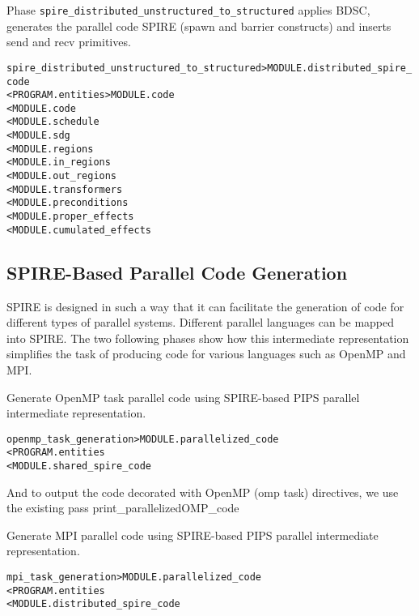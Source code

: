 \documentclass[a4paper]{report}
\newenvironment{PipsMake}{\begin{alltt}}{\end{alltt}}
\newenvironment{PipsPass}[1]{\label{pass:#1}}{}
\begin{document}
\begin{PipsPass}{spire_distributed_unstructured_to_structured}
Phase \texttt{spire\_distributed\_unstructured\_to\_structured}
applies BDSC, generates the parallel code SPIRE (spawn and barrier
constructs) and inserts send and recv primitives.
\end{PipsPass}

\begin{PipsMake}
spire_distributed_unstructured_to_structured                   > MODULE.distributed_spire_code
        < PROGRAM.entities                                     > MODULE.code
        < MODULE.code
        < MODULE.schedule
        < MODULE.sdg
        < MODULE.regions
        < MODULE.in_regions
        < MODULE.out_regions
        < MODULE.transformers
        < MODULE.preconditions
        < MODULE.proper_effects
        < MODULE.cumulated_effects
\end{PipsMake}


\subsection{SPIRE-Based Parallel Code Generation}
SPIRE is designed in such a way that it can facilitate the generation
of code for different types of parallel systems. Different parallel
languages can be mapped into SPIRE. The two following phases show how this intermediate representation simplifies the task of producing code for various languages such as OpenMP and MPI.

\begin{PipsPass}{openmp_task_generation}
Generate OpenMP task parallel code using SPIRE-based PIPS parallel
intermediate representation.
\end{PipsPass}

\begin{PipsMake}
openmp_task_generation                  > MODULE.parallelized_code
        < PROGRAM.entities
        < MODULE.shared_spire_code
\end{PipsMake}

And to output the code decorated with OpenMP (omp task)
directives, we use the existing pass print\_parallelizedOMP\_code


\begin{PipsPass}{mpi_task_generation}
Generate MPI parallel code using SPIRE-based PIPS parallel
intermediate representation.
\end{PipsPass}

\begin{PipsMake}
mpi_task_generation                  > MODULE.parallelized_code
        < PROGRAM.entities
        < MODULE.distributed_spire_code
\end{PipsMake}
\end{document}
